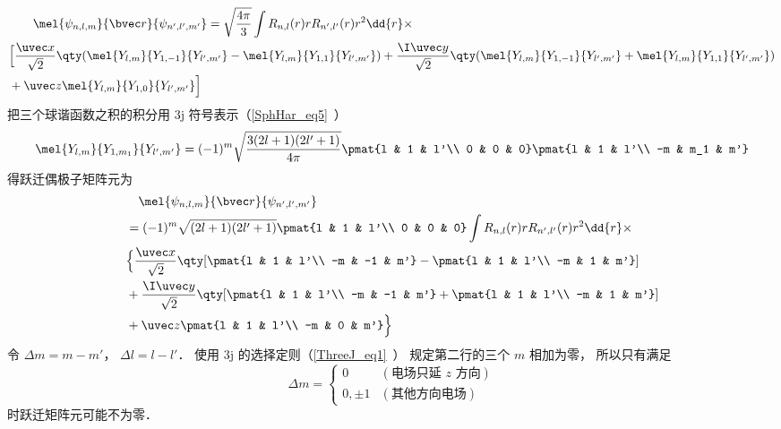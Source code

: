 \begin{equation}
\begin{aligned}
&\qquad \mel{\psi_{n,l,m}}{\bvec r}{\psi_{n',l',m'}}
= \sqrt{\frac{4\pi}{3}}\int R_{n,l}(r) r R_{n',l'}(r) r^2 \dd{r}\times\\
&\Big[\frac{\uvec x}{\sqrt 2} \qty(\mel{Y_{l,m}}{Y_{1,-1}}{Y_{l',m'}} - \mel{Y_{l,m}}{Y_{1,1}}{Y_{l',m'}})
+ \frac{\I \uvec y}{\sqrt 2} \qty(\mel{Y_{l,m}}{Y_{1,-1}}{Y_{l',m'}} + \mel{Y_{l,m}}{Y_{1,1}}{Y_{l',m'}})\\
&+ \uvec z\mel{Y_{l,m}}{Y_{1,0}}{Y_{l',m'}}\Big]
\end{aligned}
\end{equation}
把三个球谐函数之积的积分用 3j 符号表示（\autoref{SphHar_eq5}~）
\begin{equation}\label{SelRul_eq1}
\mel{Y_{l,m}}{Y_{1,m_1}}{Y_{l',m'}} = (-1)^m\sqrt{\frac{3(2l+1)(2l'+1)}{4\pi}} \pmat{l & 1 & l'\\ 0 & 0 & 0}\pmat{l & 1 & l'\\ -m & m_1 & m'}
\end{equation}
得跃迁偶极子矩阵元为
\begin{equation}
\begin{aligned}
&\quad\mel{\psi_{n,l,m}}{\bvec r}{\psi_{n',l',m'}}\\
&= (-1)^m\sqrt{(2l+1)(2l'+1)} \pmat{l & 1 & l'\\ 0 & 0 & 0} \int R_{n,l}(r) r R_{n',l'}(r) r^2 \dd{r}\times\\
&\Big\{\frac{\uvec x}{\sqrt 2} \qty[\pmat{l & 1 & l'\\ -m & -1 & m'} - \pmat{l & 1 & l'\\ -m & 1 & m'}]\\
&+ \frac{\I \uvec y}{\sqrt 2} \qty[\pmat{l & 1 & l'\\ -m & -1 & m'} + \pmat{l & 1 & l'\\ -m & 1 & m'}]\\
&+  \uvec z \pmat{l & 1 & l'\\ -m & 0 & m'}\Big\}
\end{aligned}
\end{equation}
令 $\Delta m = m - m'$， $\Delta l = l - l'$． 使用 3j 的选择定则（\autoref{ThreeJ_eq1}~） 规定第二行的三个 $m$ 相加为零， 所以只有满足
\begin{equation}\label{SelRul_eq4}
\Delta m =
\begin{cases}
0 & (\text{电场只延 $z$ 方向}) \\
0, \pm 1 & (\text{其他方向电场})
\end{cases}
\end{equation}
时跃迁矩阵元可能不为零．


